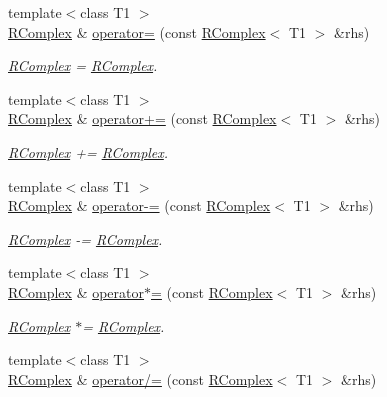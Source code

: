 \begin{DoxyCompactItemize}
{\footnotesize template$<$class T1 $>$ }\\\mbox{\hyperlink{classENSEM_1_1RComplex}{R\+Complex}} \& \mbox{\hyperlink{classENSEM_1_1RComplex_a14a5d3857ebb326ed5f211cc30da3ced}{operator=}} (const \mbox{\hyperlink{classENSEM_1_1RComplex}{R\+Complex}}$<$ T1 $>$ \&rhs)
\begin{DoxyCompactList}\small\item\em \mbox{\hyperlink{classENSEM_1_1RComplex}{R\+Complex}} = \mbox{\hyperlink{classENSEM_1_1RComplex}{R\+Complex}}. \end{DoxyCompactList}\item 
{\footnotesize template$<$class T1 $>$ }\\\mbox{\hyperlink{classENSEM_1_1RComplex}{R\+Complex}} \& \mbox{\hyperlink{classENSEM_1_1RComplex_aca53957ad00d064844898e907e6f6fab}{operator+=}} (const \mbox{\hyperlink{classENSEM_1_1RComplex}{R\+Complex}}$<$ T1 $>$ \&rhs)
\begin{DoxyCompactList}\small\item\em \mbox{\hyperlink{classENSEM_1_1RComplex}{R\+Complex}} += \mbox{\hyperlink{classENSEM_1_1RComplex}{R\+Complex}}. \end{DoxyCompactList}\item 
{\footnotesize template$<$class T1 $>$ }\\\mbox{\hyperlink{classENSEM_1_1RComplex}{R\+Complex}} \& \mbox{\hyperlink{classENSEM_1_1RComplex_aa2ad7391f0a0df5381ae7402b8b1fdb8}{operator-\/=}} (const \mbox{\hyperlink{classENSEM_1_1RComplex}{R\+Complex}}$<$ T1 $>$ \&rhs)
\begin{DoxyCompactList}\small\item\em \mbox{\hyperlink{classENSEM_1_1RComplex}{R\+Complex}} -\/= \mbox{\hyperlink{classENSEM_1_1RComplex}{R\+Complex}}. \end{DoxyCompactList}\item 
{\footnotesize template$<$class T1 $>$ }\\\mbox{\hyperlink{classENSEM_1_1RComplex}{R\+Complex}} \& \mbox{\hyperlink{classENSEM_1_1RComplex_a9b5f1c26c1d2cca0a3a0a6d38b5e49bd}{operator$\ast$=}} (const \mbox{\hyperlink{classENSEM_1_1RComplex}{R\+Complex}}$<$ T1 $>$ \&rhs)
\begin{DoxyCompactList}\small\item\em \mbox{\hyperlink{classENSEM_1_1RComplex}{R\+Complex}} $\ast$= \mbox{\hyperlink{classENSEM_1_1RComplex}{R\+Complex}}. \end{DoxyCompactList}\item 
{\footnotesize template$<$class T1 $>$ }\\\mbox{\hyperlink{classENSEM_1_1RComplex}{R\+Complex}} \& \mbox{\hyperlink{classENSEM_1_1RComplex_af06d63062569441e7fc7bb532334a109}{operator/=}} (const \mbox{\hyperlink{classENSEM_1_1RComplex}{R\+Complex}}$<$ T1 $>$ \&rhs)

\end{DoxyCompactItemize}
